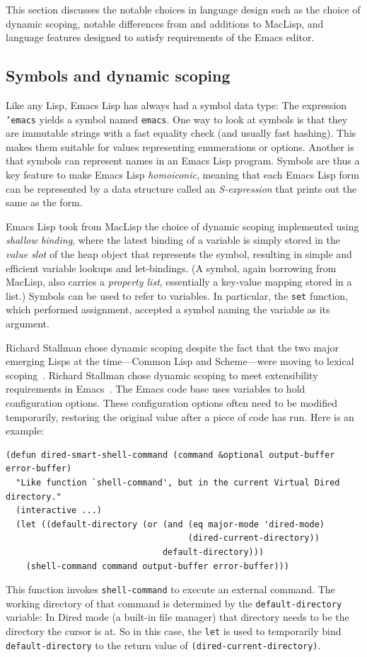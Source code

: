 \documentclass[format=acmsmall, review]{acmart}
\newcommand \Elisp {Emacs Lisp}
\begin{document}
This section discusses the notable choices in language design such as
the choice of dynamic scoping, notable differences from and additions to
MacLisp, and language features designed to satisfy requirements of the
Emacs editor.

\subsection{Symbols and dynamic scoping}
\label{sec:symbols}

Like any Lisp, \Elisp{} has always had a symbol data type: The expression
\texttt{'emacs} yields a symbol named \texttt{emacs}.  One way to look
at symbols is that they are immutable strings with a fast equality
check (and usually fast hashing).  This makes them suitable for values
representing enumerations or options.  Another is that symbols can
represent names in an \Elisp{} program.  Symbols are thus a key
feature to make \Elisp{} \textit{homoiconic}, meaning that each
\Elisp{} form can be represented by a data structure called an
\textit{S-expression} that prints out the same as the form.

\Elisp{} took from MacLisp the choice of dynamic scoping implemented using
\emph{shallow binding}, where the
latest binding of a variable is simply stored in the \emph{value slot}
of the heap object that represents the symbol, resulting in simple and efficient
variable lookups and let-bindings.  (A symbol, again borrowing from
MacLisp, also carries a \textit{property list}, essentially a key-value
mapping stored in a list.)  Symbols can be used to refer to
variables.  In particular, the \texttt{set} function, which performed
assignment, accepted a symbol naming the variable as its argument. 

Richard
Stallman chose dynamic scoping despite the fact that the two major emerging
Lisps at the time---Common Lisp and Scheme---were moving to lexical
scoping~\cite{CLtL1,R2RS}.
Richard Stallman chose dynamic scoping to meet extensibility
requirements in Emacs~\cite{Stallman1981}.  The Emacs code base uses
variables to hold configuration options.  These configuration
options often need to be modified temporarily, restoring the original
value after a piece of code has run.  Here is an example:
%
\begin{verbatim}
(defun dired-smart-shell-command (command &optional output-buffer error-buffer)
  "Like function `shell-command', but in the current Virtual Dired directory."
  (interactive ...)
  (let ((default-directory (or (and (eq major-mode 'dired-mode)
                                    (dired-current-directory))
                               default-directory)))
    (shell-command command output-buffer error-buffer)))
\end{verbatim}
%
This function invokes \texttt{shell-command} to execute an external
command.  The working directory of that command is determined by the
\texttt{default-directory} variable: In Dired mode (a built-in file
manager) that directory needs to be the directory the cursor is at.
So in this case, the \texttt{let} is used to temporarily bind
\texttt{default-directory} to the return value of
\texttt{(dired-current-directory)}.
\end{document}
